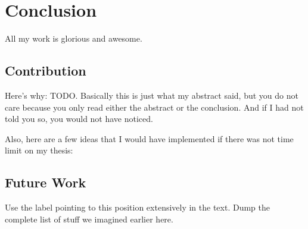 
\chapter{Conclusion}
	\label{chapter:conclusion}
	All my work is glorious and awesome.

	\section{Contribution}
		\label{sec:conclusion:contribution}
		Here's why: TODO\@. Basically this is just what my abstract said, but you do not care because you only read either
		the abstract or the conclusion. And if I had not told you so, you would not have noticed.

		Also, here are a few ideas that I would have implemented if there was not time limit on my thesis:

	\section{Future Work}
		\label{sec:conclusion:future-work}
		Use the label pointing to this position extensively in the text. Dump the complete list of stuff we imagined earlier
		here.
